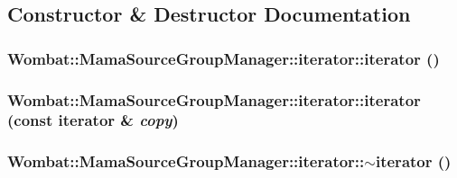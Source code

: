 \subsection{Constructor \& Destructor Documentation}
\hypertarget{classWombat_1_1MamaSourceGroupManager_1_1iterator_a65b9dd549b3f87d4ccc0d28c9220efa6}{
\subsubsection[{iterator}]{\setlength{\rightskip}{0pt plus 5cm}Wombat::MamaSourceGroupManager::iterator::iterator ()}}
\label{classWombat_1_1MamaSourceGroupManager_1_1iterator_a65b9dd549b3f87d4ccc0d28c9220efa6}
\hypertarget{classWombat_1_1MamaSourceGroupManager_1_1iterator_a26565c939231e84bd17b14dc0001adca}{
\subsubsection[{iterator}]{\setlength{\rightskip}{0pt plus 5cm}Wombat::MamaSourceGroupManager::iterator::iterator (const {\bf iterator} \& {\em copy})}}
\label{classWombat_1_1MamaSourceGroupManager_1_1iterator_a26565c939231e84bd17b14dc0001adca}
\hypertarget{classWombat_1_1MamaSourceGroupManager_1_1iterator_a1fc041ec6b5852301a2a1e2585012ae8}{
\subsubsection[{$\sim$iterator}]{\setlength{\rightskip}{0pt plus 5cm}Wombat::MamaSourceGroupManager::iterator::$\sim$iterator ()}}
\label{classWombat_1_1MamaSourceGroupManager_1_1iterator_a1fc041ec6b5852301a2a1e2585012ae8}


